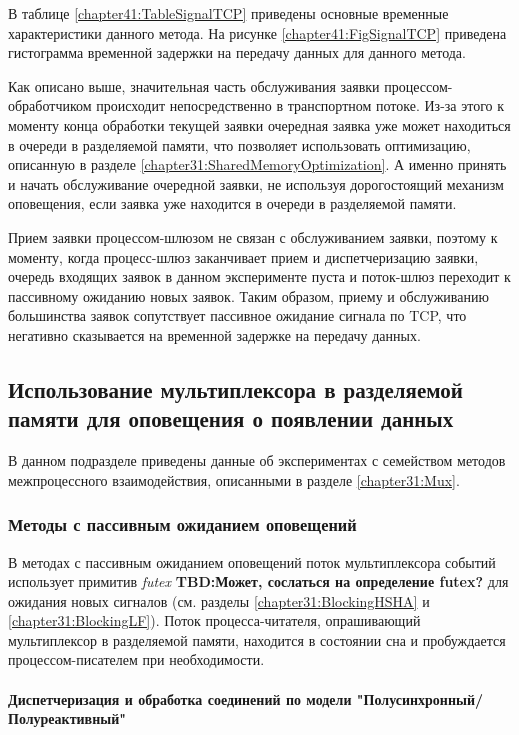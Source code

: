 В таблице \ref{chapter41:TableSignalTCP} приведены основные временные характеристики данного метода. На рисунке \ref{chapter41:FigSignalTCP} приведена гистограмма временной задержки на передачу данных для данного метода.

Как описано выше, значительная часть обслуживания заявки процессом-обработчиком происходит непосредственно в транспортном потоке. Из-за этого к моменту конца обработки текущей заявки очередная заявка уже может находиться в очереди в разделяемой памяти, что позволяет использовать оптимизацию, описанную в разделе \ref{chapter31:SharedMemoryOptimization}. А именно принять и начать обслуживание очередной заявки, не используя дорогостоящий механизм оповещения, если заявка уже находится в очереди в разделяемой памяти. 

Прием заявки процессом-шлюзом не связан с обслуживанием заявки, поэтому к моменту, когда процесс-шлюз заканчивает прием и диспетчеризацию заявки, очередь входящих заявок в данном эксперименте пуста и поток-шлюз переходит к пассивному ожиданию новых заявок. Таким образом, приему и обслуживанию большинства заявок сопутствует пассивное ожидание сигнала по TCP, что негативно сказывается на временной задержке на передачу данных.

\subsection{Использование мультиплексора в разделяемой памяти для оповещения о появлении данных}

В данном подразделе приведены данные об экспериментах с семейством методов межпроцессного взаимодействия, описанными в разделе \ref{chapter31:Mux}.

\subsubsection{Методы с пассивным ожиданием оповещений}

В методах с пассивным ожиданием оповещений поток мультиплексора событий использует примитив \textit{futex} 
\textbf{TBD:Может, сослаться на определение futex?}
для ожидания новых сигналов (см. разделы \ref{chapter31:BlockingHSHA} и \ref{chapter31:BlockingLF}). Поток процесса-читателя, опрашивающий мультиплексор в разделяемой памяти, находится в состоянии сна и пробуждается процессом-писателем при необходимости.

\paragraph{Диспетчеризация и обработка соединений по модели "Полусинхронный/Полуреактивный"}


